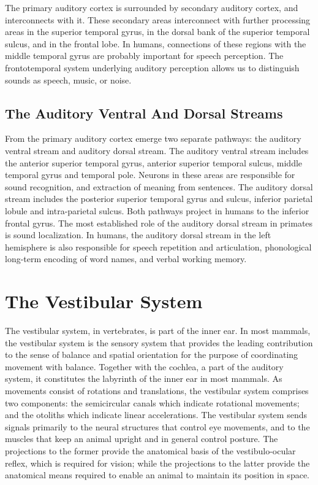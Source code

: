 The primary auditory cortex is surrounded by secondary auditory cortex, and interconnects with it. These secondary areas interconnect with further processing areas in the superior temporal gyrus, in the dorsal bank of the superior temporal sulcus, and in the frontal lobe. In humans, connections of these regions with the middle temporal gyrus are probably important for speech perception. The frontotemporal system underlying auditory perception allows us to distinguish sounds as speech, music, or noise.

\hypertarget{the-auditory-ventral-and-dorsal-streams}{%
\subsection{The Auditory Ventral And Dorsal Streams}\label{the-auditory-ventral-and-dorsal-streams}}

From the primary auditory cortex emerge two separate pathways: the auditory ventral stream and auditory dorsal stream. The auditory ventral stream includes the anterior superior temporal gyrus, anterior superior temporal sulcus, middle temporal gyrus and temporal pole. Neurons in these areas are responsible for sound recognition, and extraction of meaning from sentences. The auditory dorsal stream includes the posterior superior temporal gyrus and sulcus, inferior parietal lobule and intra-parietal sulcus. Both pathways project in humans to the inferior frontal gyrus. The most established role of the auditory dorsal stream in primates is sound localization. In humans, the auditory dorsal stream in the left hemisphere is also responsible for speech repetition and articulation, phonological long-term encoding of word names, and verbal working memory.

\hypertarget{the-vestibular-system}{%
\section{The Vestibular System}\label{the-vestibular-system}}

The vestibular system, in vertebrates, is part of the inner ear. In most mammals, the vestibular system is the sensory system that provides the leading contribution to the sense of balance and spatial orientation for the purpose of coordinating movement with balance. Together with the cochlea, a part of the auditory system, it constitutes the labyrinth of the inner ear in most mammals. As movements consist of rotations and translations, the vestibular system comprises two components: the semicircular canals which indicate rotational movements; and the otoliths which indicate linear accelerations. The vestibular system sends signals primarily to the neural structures that control eye movements, and to the muscles that keep an animal upright and in general control posture. The projections to the former provide the anatomical basis of the vestibulo-ocular reflex, which is required for vision; while the projections to the latter provide the anatomical means required to enable an animal to maintain its position in space.

